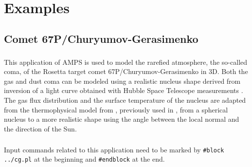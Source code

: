 \chapter{Examples}


\section{Comet 67P/Churyumov-Gerasimenko}

\paragraph{}
This application of AMPS is used to model the rarefied atmosphere, the so-called coma, of the Rosetta target comet 67P/Churyumov-Gerasimenko in 3D. Both the gas and dust coma can be modeled using a realistic nucleus shape derived from inversion of a light curve obtained with Hubble Space Telescope measurements \citep{Lamy-2006-AA}. The gas flux distribution and the surface temperature of the nucleus are adapted from the thermophysical model from \cite{Davidsson-2004-icarus,Davidsson-2005-icarus,Davidsson-2006-icarus}, previously used in  \citep{Tenishev-2008-AJ,Tenishev-2011-AJ}, from a spherical nucleus to a more realistic shape using the angle between the local normal and the direction of the Sun.

\paragraph{}
Input commands related to this application need to be marked by {\tt \#block ../cg.pl} at the beginning and {\tt \#endblock} at the end.

